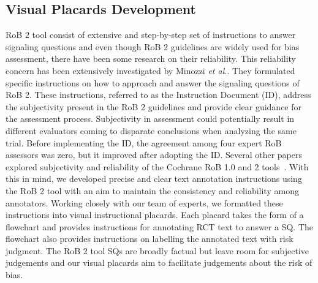 \documentclass[sn-mathphys,Numbered]{sn-jnl}%
\theoremstyle{thmstyleone}%
\theoremstyle{thmstyletwo}%
\theoremstyle{thmstylethree}%
\begin{document}
\subsection{Visual Placards Development}
\label{guidelines}
%
RoB 2 tool consist of extensive and step-by-step set of instructions to answer signaling questions and even though RoB 2 guidelines are widely used for bias assessment, there have been some research on their reliability.
This reliability concern has been extensively investigated by Minozzi \textit{et al.}. 
They formulated specific instructions on how to approach and answer the signaling questions of RoB 2.
These instructions, referred to as the Instruction Document (ID), address the subjectivity present in the RoB 2 guidelines and provide clear guidance for the assessment process.
Subjectivity in assessment could potentially result in different evaluators coming to disparate conclusions when analyzing the same trial.
Before implementing the ID, the agreement among four expert RoB assessors was zero, but it improved after adopting the ID.
Several other papers explored subjectivity and reliability of the Cochrane RoB 1.0 and 2 tools~\cite{minozzi2022reliability,da2017effect,loef2022interrater,minozzi2020revised}.
With this in mind, we developed precise and clear text annotation instructions using the RoB 2 tool with an aim to maintain the consistency and reliability among annotators.
Working closely with our team of experts, we formatted these instructions into visual instructional placards.
Each placard takes the form of a flowchart and provides instructions for annotating RCT text to answer a SQ.
The flowchart also provides instructions on labelling the annotated text with risk judgment.
The RoB 2 tool SQs are broadly factual but leave room for subjective judgements and our visual placards aim to facilitate judgements about the risk of bias.
%
%
%
\end{document}
